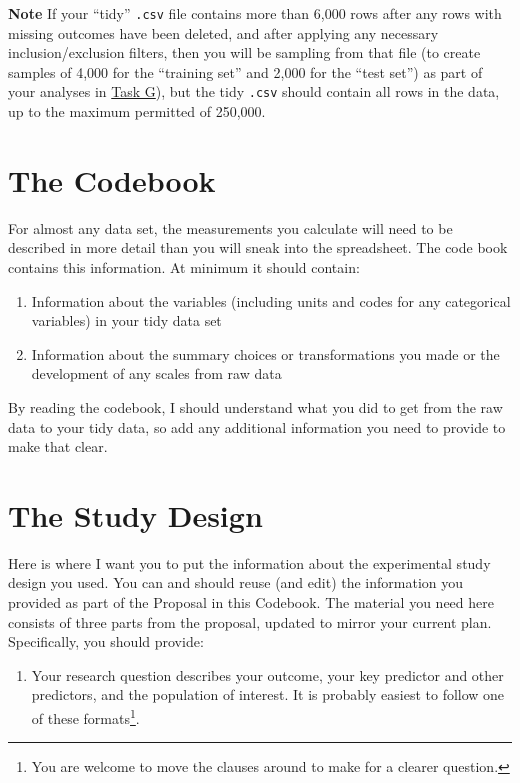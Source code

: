 \documentclass[]{book}
\providecommand{\tightlist}{%
  \setlength{\itemsep}{0pt}\setlength{\parskip}{0pt}}
\let\rmarkdownfootnote\footnote%
\def\footnote{\protect\rmarkdownfootnote}
\theoremstyle{definition}
\theoremstyle{definition}
\theoremstyle{definition}
\theoremstyle{remark}
\begin{document}
\textbf{Note} If your ``tidy'' \texttt{.csv} file contains more than
6,000 rows after any rows with missing outcomes have been deleted, and
after applying any necessary inclusion/exclusion filters, then you will
be sampling from that file (to create samples of 4,000 for the
``training set'' and 2,000 for the ``test set'') as part of your
analyses in \protect\hyperlink{taskG}{Task G}), but the tidy
\texttt{.csv} should contain all rows in the data, up to the maximum
permitted of 250,000.

\hypertarget{the-codebook}{%
\section{The Codebook}\label{the-codebook}}

For almost any data set, the measurements you calculate will need to be
described in more detail than you will sneak into the spreadsheet. The
code book contains this information. At minimum it should contain:

\begin{enumerate}
\def\labelenumi{\arabic{enumi}.}
\tightlist
\item
  Information about the variables (including units and codes for any
  categorical variables) in your tidy data set
\item
  Information about the summary choices or transformations you made or
  the development of any scales from raw data
\end{enumerate}

By reading the codebook, I should understand what you did to get from
the raw data to your tidy data, so add any additional information you
need to provide to make that clear.

\hypertarget{the-study-design}{%
\section{The Study Design}\label{the-study-design}}

Here is where I want you to put the information about the experimental
study design you used. You can and should reuse (and edit) the
information you provided as part of the Proposal in this Codebook. The
material you need here consists of three parts from the proposal,
updated to mirror your current plan. Specifically, you should provide:

\begin{enumerate}
\def\labelenumi{\arabic{enumi}.}
\tightlist
\item
  Your research question describes your outcome, your key predictor and
  other predictors, and the population of interest. It is probably
  easiest to follow one of these formats\footnote{You are welcome to
    move the clauses around to make for a clearer question.}.
\end{enumerate}
\end{document}
